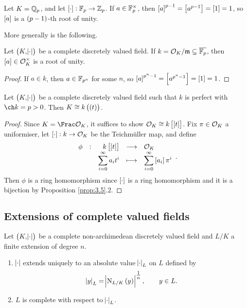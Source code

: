 \begin{example}
Let $ K = \mathbb{Q}_p $, and let $ \sbr{\cdot} : \FF_p \to \ZZ_p $. If $ a \in \mathbb{F}_p^\times $, then $ \sbr{a}^{p - 1} = \sbr{a^{p - 1}} = \sbr{1} = 1 $, so $ \sbr{a} $ is a $ \br{p - 1} $-th root of unity.
\end{example}

More generally is the following.

\begin{lemma}
Let $ \br{K, \abs{\cdot}} $ be a complete discretely valued field. If $ k = \mathcal{O}_K / \mathfrak{m} \subseteq \overline{\mathbb{F}_p} $, then $ \sbr{a} \in \OOO_K^\times $ is a root of unity.
\end{lemma}

\begin{proof}
If $ a \in k $, then $ a \in \mathbb{F}_{p^n} $ for some $ n $, so $ \sbr{a}^{p^n - 1} = \sbr{a^{p^n - 1}} = \sbr{1} = 1 $.
\end{proof}

\begin{theorem}
\label{thm:5.7}
Let $ \br{K, \abs{\cdot}} $ be a complete discretely valued field such that $ k $ is perfect with $ \ch k = p > 0 $. Then $ K \cong k\br{\br{t}} $.
\end{theorem}

\begin{proof}
Since $ K = \Frac \OOO_K $, it suffices to show $ \OOO_K \cong k\sbr{\sbr{t}} $. Fix $ \pi \in \mathcal{O}_K $ a uniformiser, let $ \sbr{\cdot} : k \to \OOO_K $ be the Teichm\"uller map, and define
$$ \function[\phi]{k\sbr{\sbr{t}}}{\OOO_K}{\displaystyle\sum_{i = 0}^\infty a_it^i}{\displaystyle\sum_{i = 0}^\infty \sbr{a_i}\pi^i}. $$
Then $ \phi $ is a ring homomorphism since $ \sbr{\cdot} $ is a ring homomorphism and it is a bijection by Proposition \ref{prop:3.5}.$ 2 $.
\end{proof}

\subsection{Extensions of complete valued fields}


\begin{theorem}
\label{thm:6.1}
Let $ \br{K, \abs{\cdot}} $ be a complete non-archimedean discretely valued field and $ L / K $ a finite extension of degree $ n $.
\begin{enumerate}
\item $ \abs{\cdot} $ extends uniquely to an absolute value $ \abs{\cdot}_L $ on $ L $ defined by
$$ \abs{y}_L = \abs{\N_{L / K}\br{y}}^{\tfrac{1}{n}}, \qquad y \in L. $$
\item $ L $ is complete with respect to $ \abs{\cdot}_L $.
\end{enumerate}
\end{theorem}

